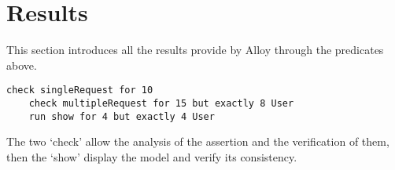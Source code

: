 \section{Results}

    This section introduces all the results provide by Alloy through the predicates above.
  
\begin{lstlisting}[language=alloy]
    check singleRequest for 10
    check multipleRequest for 15 but exactly 8 User
    run show for 4 but exactly 4 User
\end{lstlisting}

    The two `check' allow the analysis of the assertion and the verification of them, then the `show' display the model and verify its consistency.
    
